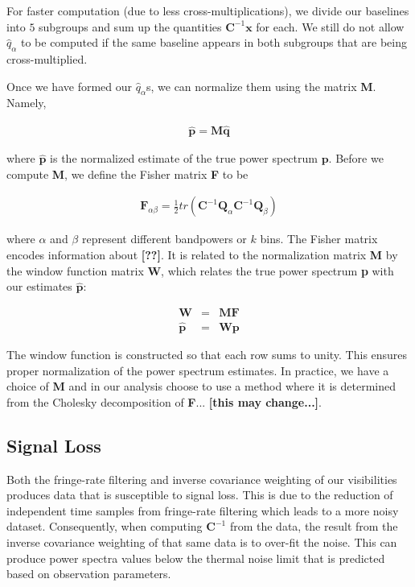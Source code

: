 \documentclass[preprint2,numberedappendix,tighten,twocolappendix]{aastex6}  %
\newcommand{\cc}[1]{{\color{purple} \textbf{[#1]}}}
\begin{document}
For faster computation (due to less cross-multiplications), we divide our baselines into $5$ subgroups and sum up the quantities $\textbf{C}^{-1}\textbf{x}$ for each. We still do not allow $\hat{q}_{\alpha}$ to be computed if the same baseline appears in both subgroups that are being cross-multiplied. 

Once we have formed our $\hat{q}_{\alpha}$s, we can normalize them using the matrix \textbf{M}. Namely,

\begin{eqnarray}
\hat{\textbf{p}} = \textbf{M}\hat{\textbf{q}}
\end{eqnarray}

\noindent where $\hat{\textbf{p}}$ is the normalized estimate of the true power spectrum $\textbf{p}$. Before we compute \textbf{M}, we define the Fisher matrix \textbf{F} to be

\begin{eqnarray}
\textbf{F}_{\alpha\beta} = \frac{1}{2}tr(\textbf{C}^{-1}\textbf{Q}_{\alpha}\textbf{C}^{-1}\textbf{Q}_{\beta})
\end{eqnarray}

\noindent where $\alpha$ and $\beta$ represent different bandpowers or $k$ bins. The Fisher matrix encodes information about \cc{??}. It is related to the normalization matrix \textbf{M} by the window function matrix \textbf{W}, which relates the true power spectrum \textbf{p} with our estimates $\hat{\textbf{p}}$:

\begin{eqnarray}
\textbf{W} &=& \textbf{MF} \\
\hat{\textbf{p}} &=& \textbf{Wp}
\end{eqnarray}

\noindent The window function is constructed so that each row sums to unity. This ensures proper normalization of the power spectrum estimates. In practice, we have a choice of \textbf{M} and in our analysis choose to use a method where it is determined from the Cholesky decomposition of \textbf{F}... \cc{this may change...}. 

\subsection{Signal Loss}
\label{sec:Sigloss}

Both the fringe-rate filtering and inverse covariance weighting of our visibilities produces data that is susceptible to signal loss. This is due to the reduction of independent time samples from fringe-rate filtering which leads to a more noisy dataset. Consequently, when computing $\textbf{C}^{-1}$ from the data, the result from the inverse covariance weighting of that same data is to over-fit the noise. This can produce power spectra values below the thermal noise limit that is predicted based on observation parameters. 
\end{document}
